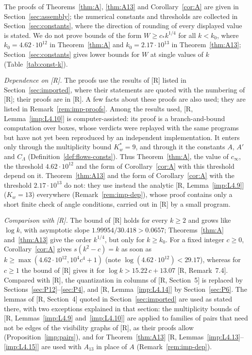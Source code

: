 \documentclass[11pt]{amsart}
\theoremstyle{definition}
\theoremstyle{remark}
\numberwithin{equation}{section}
\begin{document}
The proofs of Theorems~\ref{thm:A}, \ref{thm:A13} and Corollary~\ref{cor:A} are given in Section~\ref{sec:assembly};
the numerical constants and thresholds are collected in Section~\ref{sec:constants}, where the direction of rounding of
every displayed value is stated. We do not prove bounds of the form $W\ge c_*k^{1/4}$ for all $k<k_0$, where
$k_0=4.62\cdot10^{12}$ in Theorem~\ref{thm:A} and $k_0=2.17\cdot10^{13}$ in Theorem~\ref{thm:A13}; Section~\ref{sec:constants}
gives lower bounds for $W$ at single values of $k$ (Table~\ref{tab:const-k}).

\emph{Dependence on [R].} The proofs use the results of [R] listed in Section~\ref{sec:imported}, where their statements
are quoted with the numbering of [R]; their proofs are in [R]. A few facts about these proofs are also used; they are
listed in Remark~\ref{rem:imp-proofs}. Among the results used, [R, Lemma~\ref{imp:L4.10}] is computer-assisted: its proof
is a branch-and-bound computation over boxes, whose verdicts were replayed with the same programs \cite{LevR} but have
not yet been reproduced by an independent implementation. It enters only through the multiplicity bound $K_w^*=9$,
and through it the constants $A$, $A'$ and $C_\Lambda$ (Definition~\ref{def:flows-consts}). Thus Theorem~\ref{thm:A}, the
value of $c_\infty$, the threshold $4.62\cdot10^{12}$ and the form of Corollary~\ref{cor:A} with this threshold depend on
it. Theorem~\ref{thm:A13} and the form of Corollary~\ref{cor:A} with the threshold $2.17\cdot10^{13}$ do not: they use
instead the analytic [R, Lemma~\ref{imp:L4.9}] ($K_w=13$) everywhere (Remark~\ref{rem:imp-dep}), whose proof contains only
a short finite check of angle conditions, carried out in [R] by a small program.

\emph{Comparison with [R].} The bound of [R] holds for every $k\ge2$ and grows like $\log k$, with asymptotic slope
$1.99954/30.418>0.0657$; Theorems~\ref{thm:A} and~\ref{thm:A13} give the order $k^{1/4}$, but only for $k\ge k_0$. For a
fixed integer $c\ge0$, Corollary~\ref{cor:A} gives $s(k^2-c)=k$ as soon as $k\ge\max(4.62\cdot10^{12},10^4c^4+1)$ (note
$\log(4.62\cdot10^{12})<29.17$), whereas for $c\ge1$ the bound of [R] gives it for $\log k>15.22\,c+13.07$
[R, Remark~7.4]. Compared with [R], the quantization in columns of [R, Section~5] is replaced by
Sections~\ref{sec:P12}--\ref{sec:P4}, and [R, Lemma~\ref{imp:L4.14}] by Section~\ref{sec:P6}. The lemmas of
[R, Section~4] quoted in Section~\ref{sec:imported} are used as stated there, with two exceptions explained in that
section: the multiplicity bounds of [R, Lemmas~\ref{imp:L4.9} and~\ref{imp:L4.10}] are applied to families of pairs that
need not be edges of the visibility graphs of [R], as their proofs allow (Proposition~\ref{imp:pairs}), and for
Theorem~\ref{thm:A13} [R, Lemmas~\ref{imp:L4.13}--\ref{imp:L4.15}] are used with $A_{13}$ in place of $A$
(Remark~\ref{rem:imp-dep}).
\end{document}
